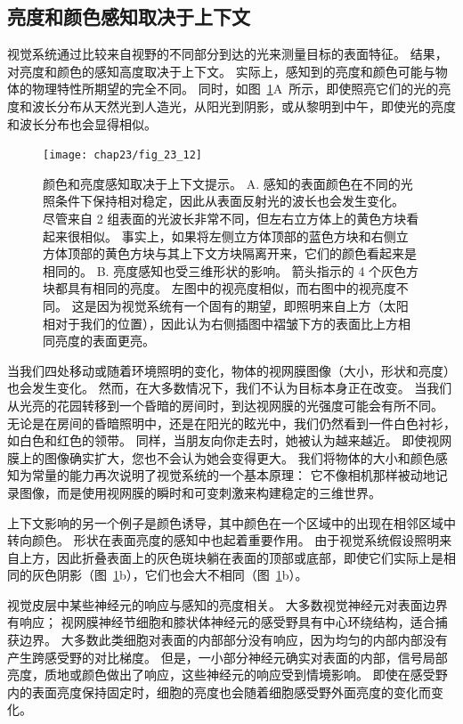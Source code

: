 \subsection{亮度和颜色感知取决于上下文}

视觉系统通过比较来自视野的不同部分到达的光来测量目标的表面特征。
结果，对亮度和颜色的感知高度取决于上下文。
实际上，感知到的亮度和颜色可能与物体的物理特性所期望的完全不同。
同时，如图~\ref{fig:23_12}A~所示，即使照亮它们的光的亮度和波长分布从天然光到人造光，从阳光到阴影，或从黎明到中午，即使光的亮度和波长分布也会显得相似。


\begin{figure}[htbp]
	\centering
	\texttt{[image: chap23/fig\_23\_12]}
	\caption{颜色和亮度感知取决于上下文提示。
		A. 感知的表面颜色在不同的光照条件下保持相对稳定，因此从表面反射光的波长也会发生变化。
		尽管来自 2 组表面的光波长非常不同，但左右立方体上的黄色方块看起来很相似。
		事实上，如果将左侧立方体顶部的蓝色方块和右侧立方体顶部的黄色方块与其上下文方块隔离开来，它们的颜色看起来是相同的。
		B. 亮度感知也受三维形状的影响。
		箭头指示的 4 个灰色方块都具有相同的亮度。
		左图中的视亮度相似，而右图中的视亮度不同。
		这是因为视觉系统有一个固有的期望，即照明来自上方（太阳相对于我们的位置），因此认为右侧插图中褶皱下方的表面比上方相同亮度的表面更亮\cite{adelson1993perceptual}。}
	\label{fig:23_12}
\end{figure}


当我们四处移动或随着环境照明的变化，物体的视网膜图像（大小，形状和亮度）也会发生变化。
然而，在大多数情况下，我们不认为目标本身正在改变。
当我们从光亮的花园转移到一个昏暗的房间时，到达视网膜的光强度可能会有所不同。
无论是在房间的昏暗照明中，还是在阳光的眩光中，我们仍然看到一件白色衬衫，如白色和红色的领带。
同样，当朋友向你走去时，她被认为越来越近。
即使视网膜上的图像确实扩大，您也不会认为她会变得更大。
我们将物体的大小和颜色感知为常量的能力再次说明了视觉系统的一个基本原理：
它不像相机那样被动地记录图像，而是使用视网膜的瞬时和可变刺激来构建稳定的三维世界。


上下文影响的另一个例子是颜色诱导，其中颜色在一个区域中的出现在相邻区域中转向颜色。
形状在表面亮度的感知中也起着重要作用。
由于视觉系统假设照明来自上方，因此折叠表面上的灰色斑块躺在表面的顶部或底部，即使它们实际上是相同的灰色阴影（图~\ref{fig:23_12}b），它们也会大不相同（图~\ref{fig:23_12}b）。


视觉皮层中某些神经元的响应与感知的亮度相关。
大多数视觉神经元对表面边界有响应；
视网膜神经节细胞和膝状体神经元的感受野具有中心环绕结构，适合捕获边界。
大多数此类细胞对表面的内部部分没有响应，因为均匀的内部内部没有产生跨感受野的对比梯度。
但是，一小部分神经元确实对表面的内部，信号局部亮度，质地或颜色做出了响应，这些神经元的响应受到情境影响。
即使在感受野内的表面亮度保持固定时，细胞的亮度也会随着细胞感受野外面亮度的变化而变化。


